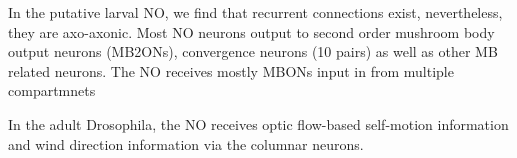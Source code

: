 \documentclass{article}
\begin{document}
In the putative larval NO, we find that recurrent connections exist, nevertheless, they are axo-axonic.
Most NO neurons output to second order mushroom body output neurons (MB2ONs), convergence neurons (10 pairs) as well as other MB related neurons. 
The NO receives mostly MBONs input in from multiple compartmnets 






In the adult Drosophila, the NO receives optic flow-based self-motion information and wind direction information via the columnar neurons. %
\end{document}

